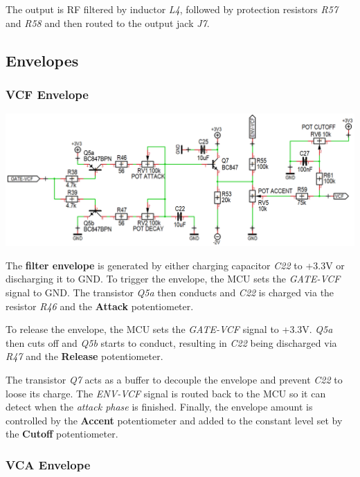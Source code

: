 \documentclass{scrartcl}
\begin{document}
The output is RF filtered by inductor \emph{L4}, followed by protection resistors \emph{R57} and \emph{R58} and then routed to the output jack \emph{J7}.

\subsection{Envelopes}

\subsubsection{VCF Envelope}

\begin{center}
    \includegraphics[scale=0.35]{assets/schema-ar-vcf.png}
\end{center}

The \textbf{filter envelope} is generated by either charging capacitor \emph{C22} to +3.3V or discharging it to GND.
To trigger the envelope, the MCU sets the \emph{GATE-VCF} signal to GND. The transistor \emph{Q5a} then conducts and \emph{C22} is charged via the resistor \emph{R46} and the \textbf{Attack} potentiometer.

To release the envelope, the MCU sets the \emph{GATE-VCF} signal to +3.3V. \emph{Q5a} then cuts off and \emph{Q5b} starts to conduct, resulting in \emph{C22} being discharged via \emph{R47} and the \textbf{Release} potentiometer.

The transistor \emph{Q7} acts as a buffer to decouple the envelope and prevent \emph{C22} to loose its charge. The \emph{ENV-VCF} signal is routed back to the MCU so it can detect when the \emph{attack phase} is finished. Finally, the envelope amount is controlled by the \textbf{Accent} potentiometer and added to the constant level set by the \textbf{Cutoff} potentiometer.

\subsubsection{VCA Envelope}
\end{document}
